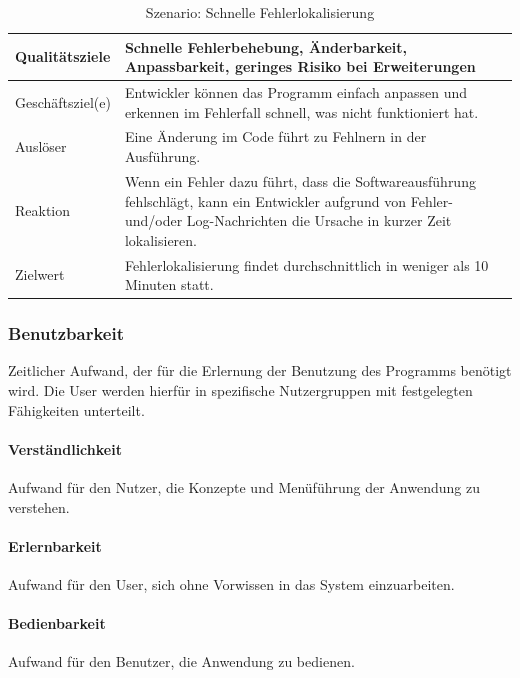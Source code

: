 \documentclass[]{subfiles}
\begin{document}
			\begin{table}[!h]
				\begin{tabularx}{\textwidth}{lX}
					\toprule
					Qualitätsziele & Schnelle Fehlerbehebung, Änderbarkeit, Anpassbarkeit, geringes Risiko bei Erweiterungen  \\
					\midrule
					Geschäftsziel(e) & Entwickler können das Programm einfach anpassen und erkennen im Fehlerfall schnell, was nicht funktioniert hat.  \\
					\midrule
					Auslöser & Eine Änderung im Code führt zu Fehlnern in der Ausführung.  \\
					\midrule
					Reaktion & Wenn ein Fehler dazu führt, dass die Softwareausführung fehlschlägt, kann ein Entwickler aufgrund von Fehler- und/oder Log-Nachrichten die Ursache in kurzer Zeit lokalisieren.  \\
					\midrule
					Zielwert & Fehlerlokalisierung findet durchschnittlich in weniger als 10 Minuten statt.  \\
					\bottomrule
				\end{tabularx}
				\caption{Szenario: Schnelle Fehlerlokalisierung}
			\end{table}
			
			\newpage

	\subsubsection{Benutzbarkeit}
		Zeitlicher Aufwand, der für die Erlernung der Benutzung des Programms benötigt wird. 
		Die User werden hierfür in spezifische Nutzergruppen mit festgelegten Fähigkeiten unterteilt.
		
		\paragraph{Verständlichkeit}
			Aufwand für den Nutzer, die Konzepte und Menüführung der Anwendung zu verstehen.

		\paragraph{Erlernbarkeit}
			Aufwand für den User, sich ohne Vorwissen in das System einzuarbeiten.

		\paragraph{Bedienbarkeit}
			Aufwand für den Benutzer, die Anwendung zu bedienen.
\end{document}
